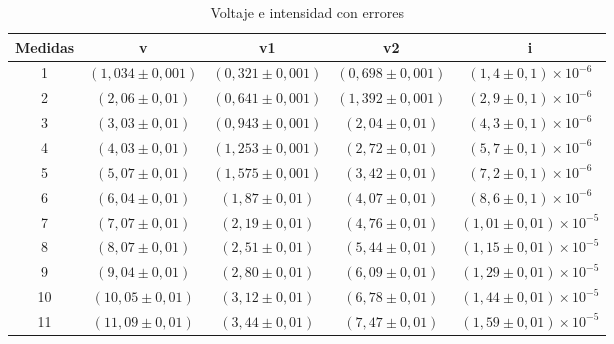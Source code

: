 \begin{table}[h]
\centering
\begin{tabular}{|c|c|c|c|c|}
\hline
Medidas & v & v1 & v2 & i \\
\hline
1 & $(1,034 \pm 0,001)$ & $(0,321 \pm 0,001)$ & $(0,698 \pm 0,001)$ & $(1,4 \pm 0,1) \times 10^{-6}$ \\
2 & $(2,06 \pm 0,01)$ & $(0,641 \pm 0,001)$ & $(1,392 \pm 0,001)$ & $(2,9 \pm 0,1) \times 10^{-6}$ \\
3 & $(3,03 \pm 0,01)$ & $(0,943 \pm 0,001)$ & $(2,04 \pm 0,01)$ & $(4,3 \pm 0,1) \times 10^{-6}$ \\
4 & $(4,03 \pm 0,01)$ & $(1,253 \pm 0,001)$ & $(2,72 \pm 0,01)$ & $(5,7 \pm 0,1) \times 10^{-6}$ \\
5 & $(5,07 \pm 0,01)$ & $(1,575 \pm 0,001)$ & $(3,42 \pm 0,01)$ & $(7,2 \pm 0,1) \times 10^{-6}$ \\
6 & $(6,04 \pm 0,01)$ & $(1,87 \pm 0,01)$ & $(4,07 \pm 0,01)$ & $(8,6 \pm 0,1) \times 10^{-6}$ \\
7 & $(7,07 \pm 0,01)$ & $(2,19 \pm 0,01)$ & $(4,76 \pm 0,01)$ & $(1,01 \pm 0,01) \times 10^{-5}$ \\
8 & $(8,07 \pm 0,01)$ & $(2,51 \pm 0,01)$ & $(5,44 \pm 0,01)$ & $(1,15 \pm 0,01) \times 10^{-5}$ \\
9 & $(9,04 \pm 0,01)$ & $(2,80 \pm 0,01)$ & $(6,09 \pm 0,01)$ & $(1,29 \pm 0,01) \times 10^{-5}$ \\
10 & $(10,05 \pm 0,01)$ & $(3,12 \pm 0,01)$ & $(6,78 \pm 0,01)$ & $(1,44 \pm 0,01) \times 10^{-5}$ \\
11 & $(11,09 \pm 0,01)$ & $(3,44 \pm 0,01)$ & $(7,47 \pm 0,01)$ & $(1,59 \pm 0,01) \times 10^{-5}$ \\
\hline
\end{tabular}
\caption{Voltaje e intensidad con errores}
\label{tab:VI}
\end{table}